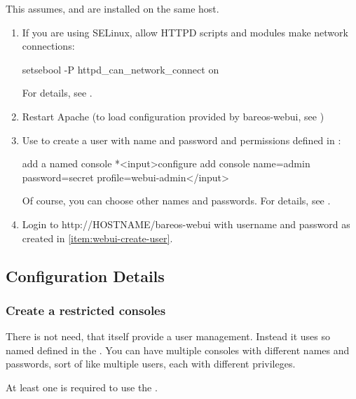 This assumes, \bareosDir and \bareosWebui are installed on the same host.

\begin{enumerate}

\item If you are using SELinux, allow HTTPD scripts and modules make network connections:
\begin{commands}{}
setsebool -P httpd_can_network_connect on
\end{commands}
For details, see .

\item Restart Apache (to load configuration provided by bareos-webui, see )

\item \label{item:webui-create-user}
Use  to create a user with name  and password  and permissions defined in :
\begin{bconsole}{add a named console}
*<input>configure add console name=admin password=secret profile=webui-admin</input>
\end{bconsole}
Of course, you can choose other names and passwords.
For details, see .

\item Login to http://HOSTNAME/bareos-webui with username and password as created in \ref{item:webui-create-user}.

\end{enumerate}


\subsection{Configuration Details}


\subsubsection{Create a restricted consoles}
    \label{sec:webui-console}

There is not need, that \bareosWebui itself provide a user management.
Instead it uses so named  defined in the \bareosDir.
You can have multiple consoles with different names and passwords, sort of like multiple users, each with different privileges.

At least one  is required to use the \bareosWebui.

